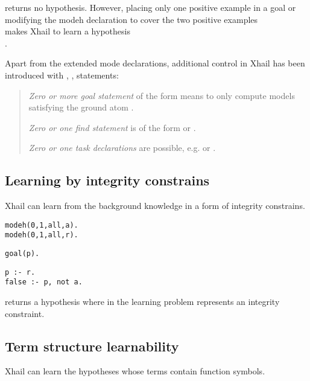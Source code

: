 returns no hypothesis. However, placing only one positive example in a goal
 or modifying the modeh declaration to cover the two positive examples\\
 makes Xhail to learn a hypothesis\\
.

Apart from the extended mode declarations, additional control in Xhail has been introduced with , ,  statements:

\begin{quote}\cite{ray2007xhail}
\emph{Zero or more goal statement} of the form  means to only compute models satisfying the ground atom .

\emph{Zero or one find statement} is of the form  or .

\emph{Zero or one task declarations} are possible, e.g.  or .
\end{quote}

\subsection{Learning by integrity constrains}
Xhail can learn from the background knowledge in a form of integrity constrains.

\begin{minipage}[t]{.30\textwidth}
\begin{lstlisting}
modeh(0,1,all,a).
modeh(0,1,all,r).
\end{lstlisting}
\end{minipage}
\begin{minipage}[t]{.20\textwidth}
\begin{lstlisting}
goal(p).
\end{lstlisting}
\end{minipage}
\begin{minipage}[t]{.20\textwidth}
\begin{lstlisting}
p :- r.
false :- p, not a.
\end{lstlisting}
\end{minipage}

returns a hypothesis  where in the learning problem
 represents an integrity constraint.

\subsection{Term structure learnability}
Xhail can learn the hypotheses whose terms contain function symbols.

